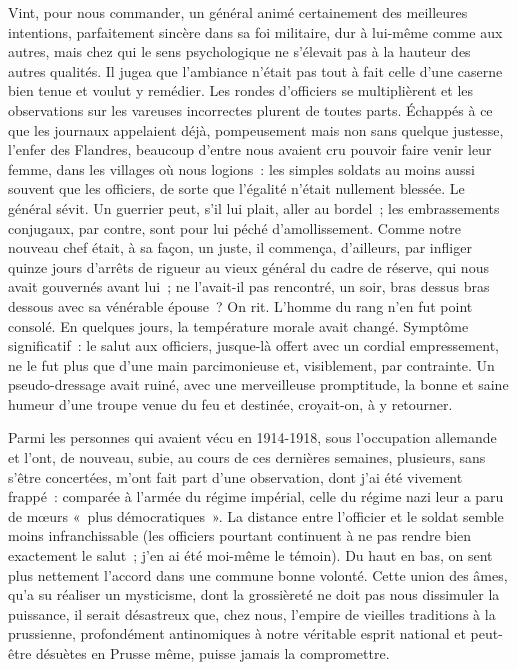 \documentclass[french,twoside]{book} %
\begin{document}
Vint, pour nous commander, un général animé certainement des meilleures intentions, parfaitement sincère dans sa foi militaire, dur à lui-même comme aux autres, mais chez qui le sens psychologique ne s’élevait pas à la hauteur des autres qualités. Il jugea que l’ambiance n’était pas tout à fait celle d’une caserne bien tenue et voulut y remédier. Les rondes d’officiers se multiplièrent et les observations sur les vareuses incorrectes plurent de toutes parts. Échappés à ce que les journaux appelaient déjà, pompeusement mais non sans quelque justesse, l’enfer des Flandres, beaucoup d’entre nous avaient cru pouvoir faire venir leur femme, dans les villages où nous logions : les simples soldats au moins aussi souvent que les officiers, de sorte que l’égalité n’était nullement blessée. Le général sévit. Un guerrier peut, s’il lui plait, aller au bordel ; les embrassements conjugaux, par contre, sont pour lui péché d’amollissement. Comme notre nouveau chef était, à sa façon, un juste, il commença, d’ailleurs, par infliger quinze jours d’arrêts de rigueur au vieux général du cadre de réserve, qui nous avait gouvernés avant lui ; ne l’avait-il pas rencontré, un soir, bras dessus bras dessous avec sa vénérable épouse ? On rit. L’homme du rang n’en fut point consolé. En quelques jours, la température morale avait changé. Symptôme significatif : le salut aux officiers, jusque-là offert avec un cordial empressement, ne le fut plus que d’une main parcimonieuse et, visiblement, par contrainte. Un pseudo-dressage avait ruiné, avec une merveilleuse promptitude, la bonne et saine humeur d’une troupe venue du feu et destinée, croyait-on, à y retourner.\par
Parmi les personnes qui avaient vécu en   1914-1918, sous l’occupation allemande et l’ont, de nouveau, subie, au cours de ces dernières semaines, plusieurs, sans s’être concertées, m’ont fait part d’une observation, dont j’ai été vivement frappé : comparée à l’armée du régime impérial, celle du régime nazi leur a paru de mœurs « plus démocratiques ». La distance entre l’officier et le soldat semble moins infranchissable (les officiers pourtant continuent à ne pas rendre bien exactement le salut ; j’en ai été moi-même le témoin). Du haut en bas, on sent plus nettement l’accord dans une commune bonne volonté. Cette union des âmes, qu’a su réaliser un mysticisme, dont la grossièreté ne doit pas nous dissimuler la puissance, il serait désastreux que, chez nous, l’empire de vieilles traditions à la prussienne, profondément antinomiques à notre véritable esprit national et peut-être désuètes en Prusse même, puisse jamais la compromettre.\par
\end{document}
